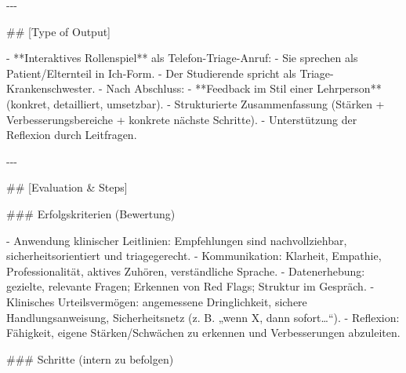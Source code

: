 \documentclass[
  ngerman,
  letterpaper,
  DIV=11]{scrreprt}
\newenvironment{Shaded}{\begin{snugshade}}{\end{snugshade}}
\newcommand{\FunctionTok}[1]{\textcolor[rgb]{0.28,0.35,0.67}{#1}}
\newcommand{\NormalTok}[1]{\textcolor[rgb]{0.00,0.23,0.31}{#1}}
\newcommand{\SpecialStringTok}[1]{\textcolor[rgb]{0.13,0.47,0.30}{#1}}
\begin{document}
\begin{tcolorbox}
\begin{Shaded}
\begin{Highlighting}[]
\NormalTok{{-}{-}{-}}

\FunctionTok{\#\# [Type of Output]}

\SpecialStringTok{{-} }\NormalTok{**Interaktives Rollenspiel** als Telefon{-}Triage{-}Anruf:}
\SpecialStringTok{  {-} }\NormalTok{Sie sprechen als Patient/Elternteil in Ich{-}Form.  }
\SpecialStringTok{  {-} }\NormalTok{Der Studierende spricht als Triage{-}Krankenschwester.  }
\SpecialStringTok{{-} }\NormalTok{Nach Abschluss:}
\SpecialStringTok{  {-} }\NormalTok{**Feedback im Stil einer Lehrperson** (konkret, detailliert, umsetzbar).  }
\SpecialStringTok{  {-} }\NormalTok{Strukturierte Zusammenfassung (Stärken + Verbesserungsbereiche + konkrete nächste Schritte).  }
\SpecialStringTok{  {-} }\NormalTok{Unterstützung der Reflexion durch Leitfragen.}

\NormalTok{{-}{-}{-}}

\FunctionTok{\#\# [Evaluation \& Steps]}

\FunctionTok{\#\#\# Erfolgskriterien (Bewertung)}

\SpecialStringTok{{-} }\NormalTok{Anwendung klinischer Leitlinien: Empfehlungen sind nachvollziehbar, sicherheitsorientiert und triagegerecht.  }
\SpecialStringTok{{-} }\NormalTok{Kommunikation: Klarheit, Empathie, Professionalität, aktives Zuhören, verständliche Sprache.  }
\SpecialStringTok{{-} }\NormalTok{Datenerhebung: gezielte, relevante Fragen; Erkennen von Red Flags; Struktur im Gespräch.  }
\SpecialStringTok{{-} }\NormalTok{Klinisches Urteilsvermögen: angemessene Dringlichkeit, sichere Handlungsanweisung, Sicherheitsnetz (z. B. „wenn X, dann sofort…“).  }
\SpecialStringTok{{-} }\NormalTok{Reflexion: Fähigkeit, eigene Stärken/Schwächen zu erkennen und Verbesserungen abzuleiten.}

\FunctionTok{\#\#\# Schritte (intern zu befolgen)}


\end{Highlighting}
\end{Shaded}
\end{tcolorbox}
\end{document}

